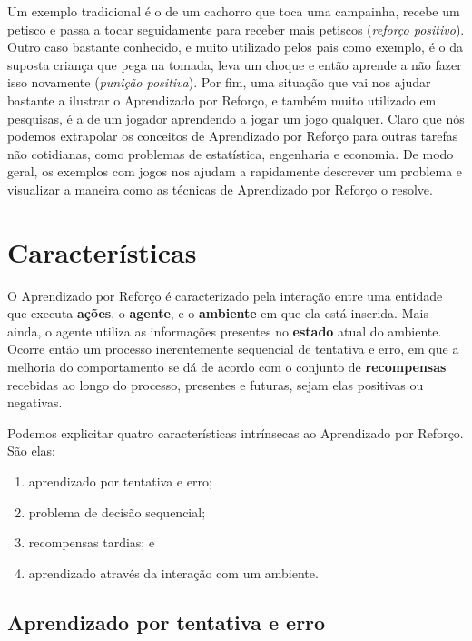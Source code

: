 \documentclass{article}
\begin{document}
        Um exemplo tradicional é o de um cachorro que toca uma campainha, recebe um petisco e passa a tocar seguidamente para receber mais petiscos (\emph{reforço positivo}). Outro caso bastante conhecido, e muito utilizado pelos pais como exemplo, é o da suposta criança que pega na tomada, leva um choque e então aprende a não fazer isso novamente (\emph{punição positiva}). Por fim, uma situação que vai nos ajudar bastante a ilustrar o Aprendizado por Reforço, e também muito utilizado em pesquisas, é a de um jogador aprendendo a jogar um jogo qualquer. Claro que nós podemos extrapolar os conceitos de Aprendizado por Reforço para outras tarefas não cotidianas, como problemas de estatística, engenharia e economia. De modo geral, os exemplos com jogos nos ajudam a rapidamente descrever um problema e visualizar a maneira como as técnicas de Aprendizado por Reforço o resolve.
            
    \section{Características}
    
        O Aprendizado por Reforço é caracterizado pela interação entre uma entidade que executa \textbf{ações}, o \textbf{agente}, e o \textbf{ambiente} em que ela está inserida. Mais ainda, o agente utiliza as informações presentes no \textbf{estado} atual do ambiente.
        Ocorre então um processo inerentemente sequencial de tentativa e erro, em que a melhoria do comportamento se dá de acordo com o conjunto de \textbf{recompensas} recebidas ao longo do processo, presentes e futuras, sejam elas positivas ou negativas.
        
        Podemos explicitar quatro características intrínsecas ao Aprendizado por Reforço. São elas:
        
        \begin{enumerate}
            \item aprendizado por tentativa e erro;
            \item problema de decisão sequencial;
            \item recompensas tardias; e
            \item aprendizado através da interação com um ambiente.
        \end{enumerate}
        
        \subsection{Aprendizado por tentativa e erro}
        
\end{document}
